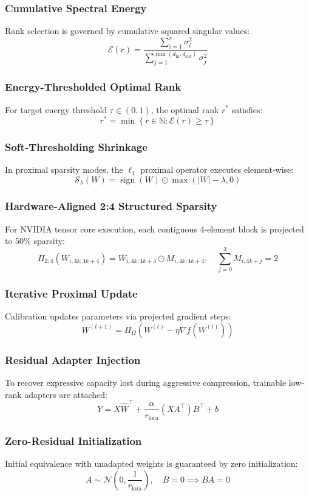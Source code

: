 \subsubsection{Cumulative Spectral Energy}
Rank selection is governed by cumulative squared singular values:
\[
\mathcal{E}(r) = \frac{\sum_{i=1}^{r} \sigma_i^2}{\sum_{j=1}^{\min(d_{\text{in}}, d_{\text{out}})} \sigma_j^2}
\]

\subsubsection{Energy-Thresholded Optimal Rank}
For target energy threshold $\tau \in (0, 1)$, the optimal rank $r^*$ satisfies:
\[
r^* = \min \left\{ r \in \mathbb{N} : \mathcal{E}(r) \ge \tau \right\}
\]

\subsubsection{Soft-Thresholding Shrinkage}
In proximal sparsity modes, the $\ell_1$ proximal operator executes element-wise:
\[
\mathcal{S}_\lambda(W) = \operatorname{sign}(W) \odot \max(|W| - \lambda, 0)
\]

\subsubsection{Hardware-Aligned 2:4 Structured Sparsity}
For NVIDIA tensor core execution, each contiguous 4-element block is projected to 50\% sparsity:
\[
\Pi_{2:4}(W_{i, 4k:4k+4}) = W_{i, 4k:4k+4} \odot M_{i, 4k:4k+4}, \quad \sum_{j=0}^{3} M_{i, 4k+j} = 2
\]

\subsubsection{Iterative Proximal Update}
Calibration updates parameters via projected gradient steps:
\[
W^{(t+1)} = \Pi_{\Omega}\left( W^{(t)} - \eta \nabla f(W^{(t)}) \right)
\]

\subsubsection{Residual Adapter Injection}
To recover expressive capacity lost during aggressive compression, trainable low-rank adapters are attached:
\[
Y = X \hat{W}^\top + \frac{\alpha}{r_{\text{lora}}} (X A^\top) B^\top + b
\]

\subsubsection{Zero-Residual Initialization}
Initial equivalence with unadapted weights is guaranteed by zero initialization:
\[
A \sim \mathcal{N}\left(0, \frac{1}{r_{\text{lora}}}\right), \quad B = 0 \implies B A = 0
\]

